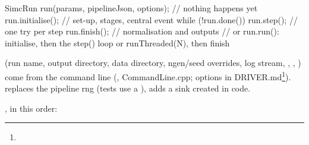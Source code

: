 \begin{simccode}[basicstyle=\ttfamily\footnotesize,style=simccpp]
SimcRun run(params, pipelineJson, options);   // nothing happens yet
run.initialise();                              // set-up, stages, central event
while (!run.done()) run.step();                // one try per step
run.finish();                                  // normalisation and outputs
// or run.run(): initialise, then the step() loop or runThreaded(N), then finish
\end{simccode}
 (run name, output directory, data directory, ngen/seed overrides, log stream, ,
, ) come from the command line (, CommandLine.\allowbreak{}cpp; options in
DRIVER.md\footnote{}).  replaces the pipeline rng (tests use a
),  adds a sink created in code.

\textbf{}, in this order:

